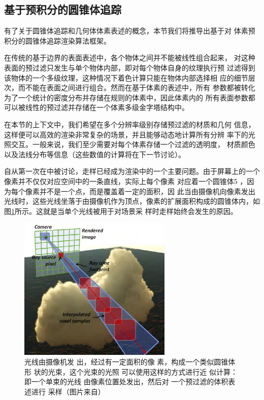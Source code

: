 \subsection{基于预积分的圆锥体追踪}\label{sec:vct-pre-integration-based-cone-tracing}
有了关于圆锥体追踪和几何体体素表述的概念，本节我们将推导出基于对 体素预积分的圆锥体追踪渲染算法框架。

在传统的基于边界的表面表述中，各个物体之间并不能被线性组合起来， 对这种表面的预过滤只发生与单个物体内部，即对每个物体自身的纹理执行预 过滤得到该物体的一个多级纹理，这种情况下着色计算只能在物体内部选择相 应的细节层次，而不能在表面之间进行组合。然而在基于体素的表述中，所有 参数都被转化为了一个统计的密度分布并存储在规则的体素中，因此体素内的 所有表面参数都可以被线性的预过滤并存储在一个体素多级金字塔结构中。

在本节的上下文中，我们希望在多个分辨率级别存储预过滤的材质和几何 信息，这样便可以高效的渲染非常复杂的场景，并且能够动态地计算所有分辨 率下的光照交互。一般来说，我们至少需要对每个体素存储一个过滤的透明度， 材质颜色以及法线分布等信息（这些数值的计算将在下一节讨论）。

自从第一次在\cite{a:Thealiasingproblemincomputer-generatedshadedimages}中被讨论，走样已经成为渲染中的一个主要问题。由于屏幕上的一个像素并不仅仅对应空间中的一条直线，实际上每个像素 对应着一个圆锥体5 ，因为每个像素并不是一个点，而是覆盖着一定的面积，因 此当由摄像机向像素发出光线时，这些光线坐落于由摄像机作为顶点，像素的扩展面积构成的圆锥体内，如图\ref{f:vct-6-1}所示。这就是当单个光线被用于对场景采 样时走样始终会发生的原因。

\begin{figure}
\sidecaption
	\includegraphics[width=0.65\textwidth]{figures/vct/vct-6-1}
	\caption{光线由摄像机发 出，经过有一定面积的像 素，构成一个类似圆锥体形 状的光束，这个光束的光照 可以使用这样的方式进行近 似计算：即一个单束的光线 由像素位置处发出，然后对 一个预过滤的体积表述进行 采样（图片来自\cite{a:InteractiveIndirectIlluminationUsingVoxelConeTracing}）}
	\label{f:vct-6-1}
\end{figure}

